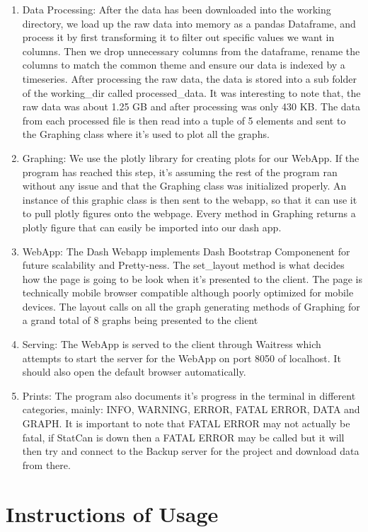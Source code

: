 \documentclass[fontsize=11pt]{article}
\begin{document}
\begin{enumerate}
        \item Data Processing: After the data has been downloaded into the working directory, we load up the raw data into memory as a pandas Dataframe, and process it by first transforming it to filter out specific values we want in columns. Then we drop unnecessary columns from the dataframe, rename the columns to match the common theme and ensure our data is indexed by a timeseries. After processing the raw data, the data is stored into a sub folder of the working\_dir called processed\_data. It was interesting to note that, the raw data was about 1.25 GB and after processing was only 430 KB. The data from each processed file is then read into a tuple of 5 elements and sent to the Graphing class where it's used to plot all the graphs.
        \item Graphing: We use the plotly library for creating plots for our WebApp. If the program has reached this step, it's assuming the rest of the program ran without any issue and that the Graphing class was initialized properly. An instance of this graphic class is then sent to the webapp, so that it can use it to pull plotly figures onto the webpage. Every method in Graphing returns a plotly figure that can easily be imported into our dash app.
        \item WebApp: The Dash Webapp implements Dash Bootstrap Componenent for future scalability and Pretty-ness. The set\_layout method is what decides how the page is going to be look when it's presented to the client. The page is technically mobile browser compatible although poorly optimized for mobile devices. The layout calls on all the graph generating methods of Graphing for a grand total of 8 graphs being presented to the client
        \item Serving: The WebApp is served to the client through Waitress which attempts to start the server for the WebApp on port 8050 of localhost. It should also open the default browser automatically.
        \item Prints: The program also documents it's progress in the terminal in different categories, mainly: INFO, WARNING, ERROR, FATAL ERROR, DATA and GRAPH. It is important to note that FATAL ERROR may not actually be fatal, if StatCan is down then a FATAL ERROR may be called but it will then try and connect to the Backup server for the project and download data from there.
    \end{enumerate}

    \newpage
    \section*{Instructions of Usage}
\end{document}
